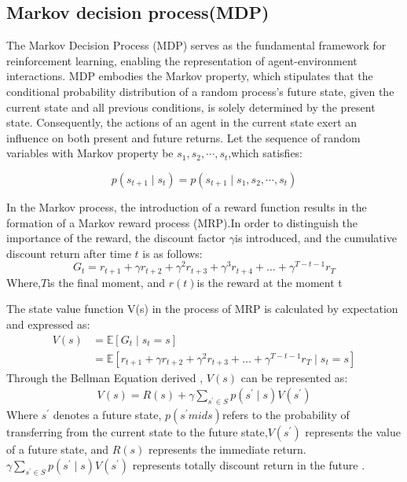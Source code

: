 \documentclass[sn-mathphys]{sn-jnl}%
\theoremstyle{thmstyleone}%
\theoremstyle{thmstyletwo}%
\theoremstyle{thmstylethree}%
\begin{document}
\subsection{Markov decision process(MDP)}\label{subsec1}
The Markov Decision Process (MDP) serves as the fundamental framework for reinforcement learning, enabling the representation of agent-environment interactions. MDP embodies the Markov property, which stipulates that the conditional probability distribution of a random process's future state, given the current state and all previous conditions, is solely determined by the present state. Consequently, the actions of an agent in the current state exert an influence on both present and future returns\cite{8585411}. Let the sequence of random variables with Markov property be $s_1,s_2,\cdots,s_t$,which satisfies:

\begin{equation}
p\left(s_{t+1} \mid s_{t}\right) =p\left(s_{t+1} \mid s_1,s_2,\cdots,s_t\right)
\end{equation}

In the Markov process, the introduction of a reward function results in the formation of a Markov reward process (MRP).In order to distinguish the importance of the reward, the discount factor $\gamma$is introduced, and the cumulative discount return after time $ t $ is as follows:
\begin{equation}
G_{t}=r_{t+1}+\gamma r_{t+2}+\gamma^{2} r_{t+3}+\gamma^{3} r_{t+4}+\ldots+\gamma^{T-t-1} r_{T}
\end{equation}
Where,$T$is the final moment, and $r(t)$is the reward at the moment t

The state value function V(s) in the process of MRP is calculated by expectation and expressed as:
\begin{equation}
\begin{aligned}
V(s) &=\mathbb{E}\left[G_{t} \mid s_{t}=s\right] \\
&=\mathbb{E}\left[r_{t+1}+\gamma r_{t+2}+\gamma^{2} r_{t+3}+\ldots+\gamma^{T-t-1} r_{T} \mid s_{t}=s\right]
\end{aligned}
\end{equation}
Through the Bellman Equation derived \cite{bellmanMarkovianDecisionProcess1957}, $ V (s) $ can be represented as:
\begin{equation}
\begin{aligned}
V(s)=R(s)+\gamma \sum_{s^{\prime} \in S} p\left(s^{\prime} \mid s\right) V\left(s^{\prime}\right)
\end{aligned}
\end{equation}
Where $s^{\prime}$ denotes a future state, $p(s^{\prime}mid s)$refers to the probability of transferring from the current state to the future state,$V(s^{\prime})$ represents the value of a future state, and $R(s)$ represents the immediate return.
$\gamma \sum_{s^{\prime} \in S} p\left(s^{\prime} \mid s\right) V\left(s^{\prime}\right)$ represents totally discount return in the future .
\end{document}
